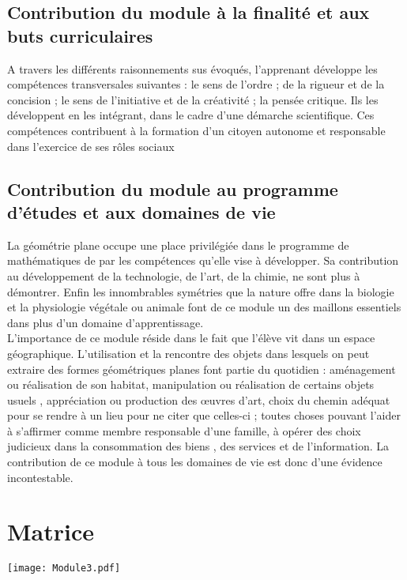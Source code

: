 \subsection{Contribution du module à la finalité et aux buts curriculaires}
A travers les différents raisonnements sus évoqués, l'apprenant développe les compétences transversales suivantes : le sens de l'ordre ; de la rigueur et de la concision ; le sens de l'initiative et de la créativité ; la pensée critique. Ils les développent en les intégrant, dans le cadre d'une démarche scientifique. Ces compétences contribuent à la formation d'un citoyen autonome et responsable dans l'exercice de ses rôles sociaux

\subsection{Contribution du module au programme d'études et aux domaines de vie}
La géométrie plane occupe une place privilégiée dans le programme de mathématiques de par les compétences qu'elle vise à développer. Sa contribution au développement de la technologie, de l'art, de la chimie, ne sont plus à démontrer. Enfin les innombrables symétries que la nature offre dans la biologie et la physiologie végétale ou animale font de ce module un des maillons essentiels dans plus d'un domaine d'apprentissage.\\
L'importance de ce module réside dans le fait que l'élève vit dans un espace géographique. L'utilisation et la rencontre des objets dans lesquels on peut extraire des formes géométriques planes font partie du quotidien : aménagement ou réalisation de son habitat, manipulation ou réalisation de certains objets usuels , appréciation ou production des œuvres d'art, choix du chemin adéquat pour se rendre à un lieu pour ne citer que celles-ci ; toutes choses pouvant l'aider à s'affirmer comme membre responsable d'une famille, à opérer des choix judicieux dans la consommation des biens , des services et de l'information. La contribution de ce module à tous les domaines de vie est donc d'une évidence incontestable.

\section{Matrice}

\texttt{[image: Module3.pdf]} 

\subsection*{}

